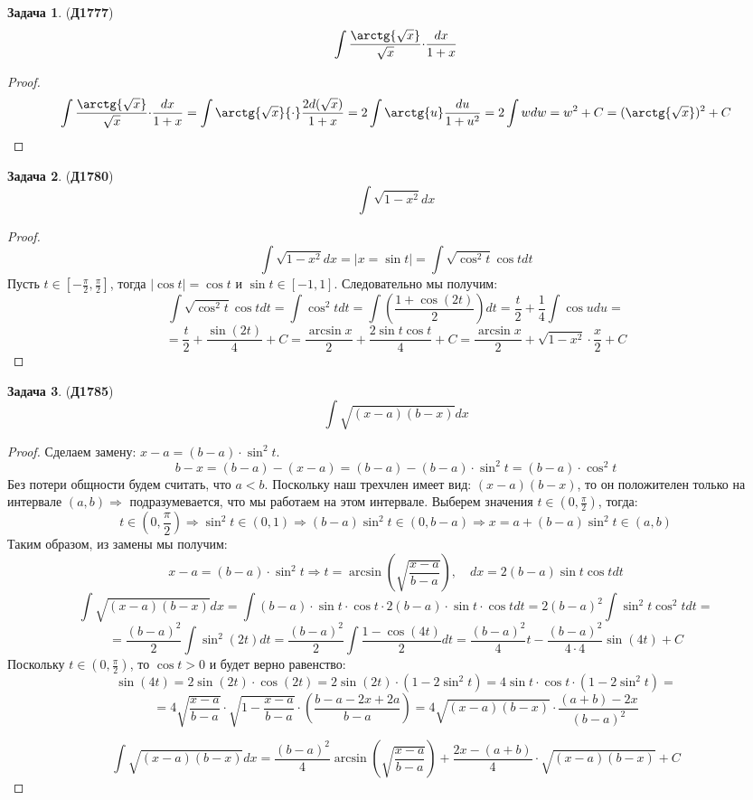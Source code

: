 \documentclass[12pt]{article}
\theoremstyle{definition}
\newtheorem{problem}{Задача}
\DeclareMathOperator{\dint}{\displaystyle\int}
\begin{document}
\begin{problem}(\textbf{Д1777})
	$$
		\dint\dfrac{\arctg{\sqrt{x}}}{\sqrt{x}}{\cdot}\dfrac{dx}{1+x}
	$$
\end{problem}
\begin{proof}
	$$
		\dint\dfrac{\arctg{\sqrt{x}}}{\sqrt{x}}{\cdot}\dfrac{dx}{1+x} = \dint \arctg{\sqrt{x}}{\cdot}\dfrac{2d(\sqrt{x})}{1 + x} = 2\dint \arctg{u} \dfrac{du}{1 + u^2} = 2 \dint w dw = w^2 + C = (\arctg{\sqrt{x}})^2 + C
	$$
\end{proof}
\newpage
\begin{problem}(\textbf{Д1780})
	$$
		\dint\sqrt{1 - x^2}dx
	$$
\end{problem}
\begin{proof}
	$$
		\dint\sqrt{1 - x^2}dx = |x  = \sin{t}| = \dint \sqrt{\cos^2{t}}\cos{t}dt
	$$
	Пусть $t \in\left[-\frac{\pi}{2},\frac{\pi}{2}\right]$, тогда $|\cos{t}| = \cos{t}$ и $\sin{t} \in [-1,1]$. Следовательно мы получим:
	$$
		\dint \sqrt{\cos^2{t}}\cos{t}dt = \dint \cos^2{t}dt = \dint \left(\dfrac{ 1 + \cos{(2t)}}{2}\right)dt = \dfrac{t}{2} + \dfrac{1}{4}\dint \cos{u}du =
	$$
	$$
		= \dfrac{t}{2}	+ \dfrac{\sin{(2t)}}{4} + C= \dfrac{\arcsin{x}}{2} + \dfrac{2\sin{t}\cos{t}}{4} + C =  \dfrac{\arcsin{x}}{2} + \sqrt{1 -x^2}{\cdot}\dfrac{x}{2} + C
	$$
\end{proof}
\begin{problem}(\textbf{Д1785})
	$$
		\dint\sqrt{(x-a)(b-x)}dx
	$$
\end{problem}
\begin{proof}
	Сделаем замену: $x - a = (b - a){\cdot}\sin^2{t}$.
	$$
		b - x = (b - a) - (x - a) = (b - a) - (b - a){\cdot}\sin^2{t} = (b-a){\cdot}\cos^2{t}
	$$
	Без потери общности будем считать, что $a < b$. Поскольку наш трехчлен имеет вид: $(x - a)(b - x)$, то он положителен только на интервале $(a,b) \Rightarrow $ подразумевается, что мы работаем на этом интервале. 
	Выберем значения $t \in \left(0,\frac{\pi}{2}\right)$, тогда: 
	$$
		t \in \left(0,\frac{\pi}{2}\right) \Rightarrow \sin^2{t} \in (0,1) \Rightarrow (b-a)\sin^2{t} \in (0, b-a) \Rightarrow x = a + (b-a)\sin^2{t} \in (a,b)
	$$
	Таким образом, из замены мы получим:
	$$
		x - a = (b - a){\cdot}\sin^2{t} \Rightarrow t = \arcsin{\left(\sqrt{\dfrac{x- a}{b-a}}\right)}, \quad dx = 2(b-a)\sin{t}\cos{t}dt
	$$
	$$
		\dint \sqrt{(x-a)(b-x)}dx = \dint (b-a){\cdot}\sin{t}{\cdot}\cos{t} {\cdot}2(b-a){\cdot}\sin{t}{\cdot}\cos{t}dt = 2(b-a)^2\dint \sin^2{t}\cos^2{t}dt=
	$$
	$$
		=\dfrac{(b-a)^2}{2}\dint \sin^{2}(2t)dt = \dfrac{(b-a)^2}{2}\dint \dfrac{1 - \cos{(4t)}}{2}dt = \dfrac{(b-a)^2}{4}t - \dfrac{(b-a)^2}{4{\cdot}4}\sin{(4t)} +C 
	$$
	Поскольку $t \in (0,\frac{\pi}{2})$, то $\cos{t} > 0$ и будет верно равенство:
	$$
		\sin{(4t)} = 2\sin{(2t)}{\cdot}\cos{(2t)} = 2\sin{(2t)}{\cdot}(1 - 2\sin^2{t}) = 4\sin{t}{\cdot}\cos{t}{\cdot}(1 - 2\sin^2{t}) =
	$$
	$$
		= 4\sqrt{\dfrac{x -a}{b-a}}{\cdot}\sqrt{1 - \dfrac{x -a}{b-a}}{\cdot}\left(\dfrac{b-a - 2x + 2a}{b-a}\right) = 4 \sqrt{(x-a)(b-x)}{\cdot}\dfrac{(a + b) - 2x}{(b-a)^2}
	$$

	$$
		\dint\sqrt{(x-a)(b-x)}dx = \dfrac{(b-a)^2}{4}\arcsin{\left(\sqrt{\dfrac{x- a}{b-a}}\right)} + \dfrac{2x - (a+ b)}{4}{\cdot}\sqrt{(x-a)(b-x)} + C
	$$
\end{proof}
\end{document}
